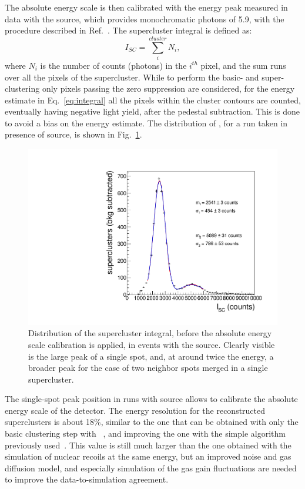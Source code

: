 The absolute energy scale is then calibrated with the energy peak
measured in data with the \fe source, which provides monochromatic
photons of 5.9\keV, with the procedure described in
Ref.~\cite{bib:fe55}. The supercluster integral is defined as:
\begin{equation}
\label{eq:integral}
I_{SC} = \sum_i^{cluster} N_i,
\end{equation}
where $N_i$ is the number of counts (photons) in the $i^{th}$ pixel,
and the sum runs over all the pixels of the supercluster.  While to
perform the basic- and super-clustering only pixels passing the zero
suppression are considered, for the energy estimate in
Eq.~\ref{eq:integral} all the pixels within the cluster contours are
counted, eventually having negative light yield, after the pedestal
subtraction. This is done to avoid a bias on the energy estimate.
The distribution of \isclu, for a run taken in presence of \fe source,
is shown in Fig.~\ref{fig:feuncalibpeak}.
%
\begin{figure}[ht]
  \begin{center}
    \includegraphics[width=0.49\linewidth]{figures/fe_ucalibintegral_fit}
    \caption{Distribution of the supercluster integral, before the
      absolute energy scale calibration is applied, in events with the
      \fe source. Clearly visible is the large peak of a single spot,
      and, at around twice the energy, a broader peak for the case of
      two neighbor spots merged in a single supercluster.
      \label{fig:feuncalibpeak}}
  \end{center}
\end{figure}
%
The single-spot peak position in runs with \fe source allows to
calibrate the absolute energy scale of the \lemon detector.  The
energy resolution for the reconstructed \gac superclusters is about
18\%, similar to the one that can be obtained with only the basic
clustering step with \idbscan~\cite{iDBSCAN}, and improving the one
with the simple \nnc algorithm previously used~\cite{bib:fe55}. This
value is still much larger than the one obtained with the simulation
of nuclear recoils at the same energy, but an improved noise and gas
diffusion model, and especially simulation of the gas gain
fluctuations are needed to improve the data-to-simulation agreement.


